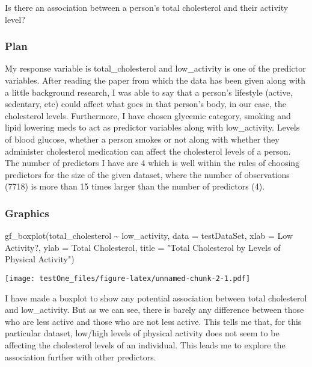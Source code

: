 \documentclass[
]{article}
\newenvironment{Shaded}{\begin{snugshade}}{\end{snugshade}}
\newcommand{\AttributeTok}[1]{\textcolor[rgb]{0.77,0.63,0.00}{#1}}
\newcommand{\FunctionTok}[1]{\textcolor[rgb]{0.00,0.00,0.00}{#1}}
\newcommand{\NormalTok}[1]{#1}
\newcommand{\SpecialCharTok}[1]{\textcolor[rgb]{0.00,0.00,0.00}{#1}}
\newcommand{\StringTok}[1]{\textcolor[rgb]{0.31,0.60,0.02}{#1}}
\begin{document}
Is there an association between a person's total cholesterol and their
activity level?

\hypertarget{plan}{%
\subsubsection{Plan}\label{plan}}

My response variable is total\_cholesterol and low\_activity is one of
the predictor variables. After reading the paper from which the data has
been given along with a little background research, I was able to say
that a person's lifestyle (active, sedentary, etc) could affect what
goes in that person's body, in our case, the cholesterol levels.
Furthermore, I have chosen glycemic category, smoking and lipid lowering
meds to act as predictor variables along with low\_activity. Levels of
blood glucose, whether a person smokes or not along with whether they
administer cholesterol medication can affect the cholesterol levels of a
person. The number of predictors I have are 4 which is well within the
rules of choosing predictors for the size of the given dataset, where
the number of observations (7718) is more than 15 times larger than the
number of predictors (4).

\hypertarget{graphics}{%
\subsubsection{Graphics}\label{graphics}}

\begin{Shaded}
\begin{Highlighting}[]
\FunctionTok{gf\_boxplot}\NormalTok{(total\_cholesterol }\SpecialCharTok{\textasciitilde{}}\NormalTok{ low\_activity, }\AttributeTok{data =}\NormalTok{ testDataSet, }
  \AttributeTok{xlab =} \StringTok{\textquotesingle{}Low Activity?\textquotesingle{}}\NormalTok{, }
  \AttributeTok{ylab =} \StringTok{\textquotesingle{}Total Cholesterol\textquotesingle{}}\NormalTok{, }
  \AttributeTok{title =} \StringTok{"Total Cholesterol by Levels of Physical Activity"}\NormalTok{)}
\end{Highlighting}
\end{Shaded}

\texttt{[image: testOne\_files/figure-latex/unnamed-chunk-2-1.pdf]}

I have made a boxplot to show any potential association between total
cholesterol and low\_activity. But as we can see, there is barely any
difference between those who are less active and those who are not less
active. This tells me that, for this particular dataset, low/high levels
of physical activity does not seem to be affecting the cholesterol
levels of an individual. This leads me to explore the association
further with other predictors.
\end{document}
